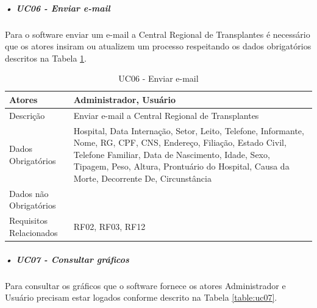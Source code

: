 \documentclass[portuguese,oneside]{tcc}
\begin{document}

\subparagraph{• UC06 - Enviar e-mail}
Para o software enviar um e-mail a Central Regional de Transplantes é necessário que os atores insiram ou atualizem um processo respeitando os dados obrigatórios descritos na Tabela \ref{table:uc06}. 

\begin{table}
\centering
\caption{UC06 - Enviar e-mail} \label{table:uc06}
\begin{tabular}{ |p{5cm}|p{5cm}|  }
\hline
Atores & 
Administrador, Usuário\\

\hline
Descrição & 
 
Enviar e-mail a Central Regional de Transplantes
 \\

\hline
Dados Obrigatórios & 
Hospital, Data Internação, Setor, Leito, Telefone, Informante, Nome, RG, CPF, CNS, Endereço, Filiação, Estado Civil, Telefone Familiar, Data de Nascimento, Idade, Sexo, Tipagem, Peso, Altura, Prontuário do Hospital, Causa da Morte, Decorrente De, Circunstância
 \\

\hline
Dados não Obrigatórios & 

 \\

\hline
Requisitos Relacionados & 
RF02, RF03, RF12
 \\

\hline
\end{tabular}
\end{table}



\subparagraph{• UC07 - Consultar gráficos}
Para consultar os gráficos que o software fornece os atores Administrador e Usuário precisam estar logados conforme descrito na Tabela \ref{table:uc07}. 
\end{document}
